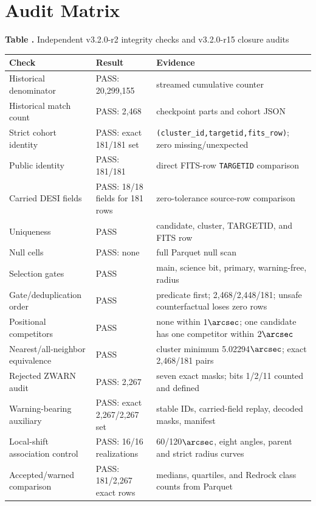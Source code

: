 \documentclass[twocolumn,linenumbers]{aastex702}
\newcommand{\paperVersion}{v3.2.0-r15}
\newcommand{\releaseVersion}{v3.2.0-r2}
\begin{document}
\section{Audit Matrix}\label{app:audit}

\label{tab:audit}
\begin{center}
\textbf{Table \thetable.} Independent \releaseVersion{} integrity checks and \paperVersion{} closure audits

\smallskip
\scriptsize
\begin{tabular}{p{}p{}p{}}
\toprule
Check & Result & Evidence \\
\midrule
Historical denominator & PASS: 20,299,155 & streamed cumulative counter \\
Historical match count & PASS: 2,468 & checkpoint parts and cohort JSON \\
Strict cohort identity & PASS: exact 181/181 set & \texttt{(cluster\_id,targetid,fits\_row)}; zero missing/unexpected \\
Public identity & PASS: 181/181 & direct FITS-row \texttt{TARGETID} comparison \\
Carried DESI fields & PASS: 18/18 fields for 181 rows & zero-tolerance source-row comparison \\
Uniqueness & PASS & candidate, cluster, TARGETID, and FITS row \\
Null cells & PASS: none & full Parquet null scan \\
Selection gates & PASS & main, science bit, primary, warning-free, radius \\
Gate/deduplication order & PASS & predicate first; 2,468/2,448/181; unsafe counterfactual loses zero rows \\
Positional competitors & PASS & none within $1\arcsec$; one candidate has one competitor within $2\arcsec$ \\
Nearest/all-neighbor equivalence & PASS & cluster minimum 5.02294$\arcsec$; exact 2,468/181 pairs \\
Rejected ZWARN audit & PASS: 2,267 & seven exact masks; bits 1/2/11 counted and defined \\
Warning-bearing auxiliary & PASS: exact 2,267/2,267 set & stable IDs, carried-field replay, decoded masks, manifest \\
Local-shift association control & PASS: 16/16 realizations & 60/120$\arcsec$, eight angles, parent and strict radius curves \\
Accepted/warned comparison & PASS: 181/2,267 exact rows & medians, quartiles, and Redrock class counts from Parquet \\

\end{tabular}
\end{center}
\end{document}
